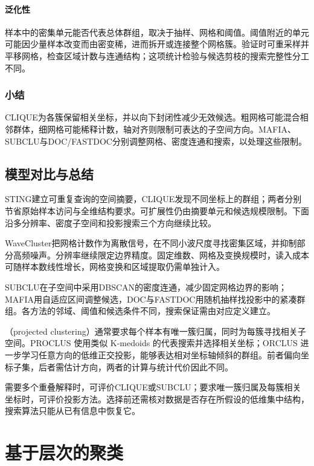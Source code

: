 \paragraph{泛化性}
样本中的密集单元能否代表总体群组，取决于抽样、网格和阈值。阈值附近的单元可能因少量样本改变而由密变稀，进而拆开或连接整个网格簇。验证时可重采样并平移网格，检查区域计数与连通结构；这项统计检验与候选剪枝的搜索完整性分工不同。

\subsubsection{小结}

CLIQUE为各簇保留相关坐标，并以向下封闭性减少无效候选。粗网格可能混合相邻群体，细网格可能稀释计数，轴对齐则限制可表达的子空间方向。MAFIA、SUBCLU与DOC/FASTDOC分别调整网格、密度连通和搜索，以处理这些限制。

\subsection{模型对比与总结}

STING建立可重复查询的空间摘要，CLIQUE发现不同坐标上的群组；两者分别节省原始样本访问与全维结构要求。可扩展性仍由摘要单元和候选规模限制。下面沿多分辨率、密度子空间和投影搜索三个方向继续比较。

WaveCluster把网格计数作为离散信号，在不同小波尺度寻找密集区域，并抑制部分高频噪声。分辨率继续限定边界精度。固定维数、网格及变换规模时，读入成本可随样本数线性增长，网格变换和区域提取仍需单独计入。

SUBCLU在子空间中采用DBSCAN的密度连通，减少固定网格边界的影响；MAFIA用自适应区间调整候选，DOC与FASTDOC用随机抽样找投影中的紧凑群组。各方法的邻域、阈值和候选条件不同，搜索保证需由对应定义建立。

（projected clustering）通常要求每个样本有唯一簇归属，同时为每簇寻找相关子空间。PROCLUS 使用类似 K-medoids 的代表搜索并选择相关坐标；ORCLUS 进一步学习任意方向的低维正交投影，能够表达相对坐标轴倾斜的群组。前者偏向坐标子集，后者需估计方向，两者的计算与统计代价因此不同。

需要多个重叠解释时，可评价CLIQUE或SUBCLU；要求唯一簇归属及每簇相关坐标时，可评价投影方法。选择前还需核对数据是否存在所假设的低维集中结构，搜索算法只能从已有信息中恢复它。

\section{基于层次的聚类}
\label{sec:clustering-hierarchy}

